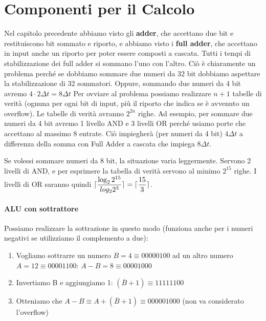 \FloatBarrier

\section{Componenti per il Calcolo}

Nel capitolo precedente abbiamo visto gli \textbf{adder}, che accettano due bit e restituiscono bit sommato e riporto, e abbiamo visto i \textbf{full adder}, che accettano in input anche un riporto per poter essere composti a cascata. Tutti i tempi di stabilizzazione dei full adder si sommano l'uno con l'altro. Ciò è chiaramente un problema perché se dobbiamo sommare due numeri da 32 bit dobbiamo aspettare la stabilizzazione di 32 sommatori. Oppure, sommando due numeri da 4 bit avremo $ 4 \cdot 2 \Delta t = 8 \Delta t $
Per ovviare al problema possiamo realizzare $ n + 1 $ tabelle di verità (ognuna per ogni bit di input, più il riporto che indica se è avvenuto un overflow). Le tabelle di verità avranno $ 2^{2n} $ righe. Ad esempio, per sommare due numeri da 4 bit avremo 1 livello AND e 3 livelli OR perché usiamo porte che accettano al massimo 8 entrate. Ciò impiegherà (per numeri da 4 bit) $ 4 \Delta t $ a differenza della somma con Full Adder a cascata che impiega $ 8 \Delta t $.

Se volessi sommare numeri da 8 bit, la situazione varia leggermente. Servono 2 livelli di AND, e per esprimere la tabella di verità servono al minimo $ 2^{15} $ righe. I livelli di OR saranno quindi $ \lceil\dfrac{\log_2 2^{15}}{log_2 2^3}\rceil =  \lceil\dfrac{15}{3}\rceil $.


\paragraph{ALU con sottrattore}

Possiamo realizzare la sottrazione in questo modo (funziona anche per i numeri negativi se utilizziamo il complemento a due):
\begin{enumerate}
	\item Vogliamo sottrarre un numero $ B = 4 \equiv 00000100$ ad un altro numero $ A = 12 \equiv 00001100 $: $ A - B = 8 \equiv 00001000 $
	\item Invertiamo B e aggiungiamo 1: $ (\overbar{B} + 1) \equiv 11111100 $
	\item Otteniamo che $ A - B \equiv A + (\overbar{B} + 1) \equiv 000001000 $ (non va considerato l'overflow)	
\end{enumerate}

